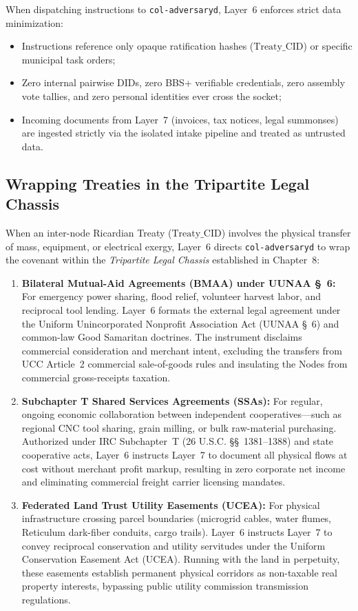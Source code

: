 When dispatching instructions to \texttt{col-adversaryd}, Layer~6 enforces strict data minimization:
\begin{itemize}
  \item Instructions reference only opaque ratification hashes ($\mathrm{Treaty\_CID}$) or specific municipal task orders;
  \item Zero internal pairwise DIDs, zero BBS+ verifiable credentials, zero assembly vote tallies, and zero personal identities ever cross the socket;
  \item Incoming documents from Layer~7 (invoices, tax notices, legal summonses) are ingested strictly via the isolated intake pipeline and treated as untrusted data.
\end{itemize}

\subsection{Wrapping Treaties in the Tripartite Legal Chassis}

When an inter-node Ricardian Treaty ($\mathrm{Treaty\_CID}$) involves the physical transfer of mass, equipment, or electrical exergy, Layer~6 directs \texttt{col-adversaryd} to wrap the covenant within the \textit{Tripartite Legal Chassis} established in Chapter~8:

\begin{enumerate}
  \item \textbf{Bilateral Mutual-Aid Agreements (BMAA) under UUNAA \S~6:} For emergency power sharing, flood relief, volunteer harvest labor, and reciprocal tool lending. Layer~6 formats the external legal agreement under the Uniform Unincorporated Nonprofit Association Act (UUNAA \S~6) and common-law Good Samaritan doctrines. The instrument disclaims commercial consideration and merchant intent, excluding the transfers from UCC Article~2 commercial sale-of-goods rules and insulating the Nodes from commercial gross-receipts taxation.
  
  \item \textbf{Subchapter T Shared Services Agreements (SSAs):} For regular, ongoing economic collaboration between independent cooperatives---such as regional CNC tool sharing, grain milling, or bulk raw-material purchasing. Authorized under IRC Subchapter~T (26 U.S.C. \S\S~1381--1388) and state cooperative acts, Layer~6 instructs Layer~7 to document all physical flows at cost without merchant profit markup, resulting in zero corporate net income and eliminating commercial freight carrier licensing mandates.
  
  \item \textbf{Federated Land Trust Utility Easements (UCEA):} For physical infrastructure crossing parcel boundaries (microgrid cables, water flumes, Reticulum dark-fiber conduits, cargo trails). Layer~6 instructs Layer~7 to convey reciprocal conservation and utility servitudes under the Uniform Conservation Easement Act (UCEA). Running with the land in perpetuity, these easements establish permanent physical corridors as non-taxable real property interests, bypassing public utility commission transmission regulations.
\end{enumerate}

